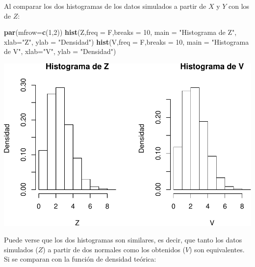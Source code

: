 \documentclass[]{article}
\newenvironment{Shaded}{\begin{snugshade}}{\end{snugshade}}
\newcommand{\KeywordTok}[1]{\textcolor[rgb]{0.13,0.29,0.53}{\textbf{#1}}}
\newcommand{\DataTypeTok}[1]{\textcolor[rgb]{0.13,0.29,0.53}{#1}}
\newcommand{\DecValTok}[1]{\textcolor[rgb]{0.00,0.00,0.81}{#1}}
\newcommand{\StringTok}[1]{\textcolor[rgb]{0.31,0.60,0.02}{#1}}
\newcommand{\NormalTok}[1]{#1}
\begin{document}
Al comparar los dos histogramas de los datos simulados a partir de \(X\)
y \(Y\) con los de \(Z\):

\begin{Shaded}
\begin{Highlighting}[]
\KeywordTok{par}\NormalTok{(}\DataTypeTok{mfrow=}\KeywordTok{c}\NormalTok{(}\DecValTok{1}\NormalTok{,}\DecValTok{2}\NormalTok{))}
\KeywordTok{hist}\NormalTok{(Z,}\DataTypeTok{freq =}\NormalTok{ F,}\DataTypeTok{breaks =} \DecValTok{10}\NormalTok{, }\DataTypeTok{main =} \StringTok{"Histograma de Z"}\NormalTok{, }\DataTypeTok{xlab=}\StringTok{"Z"}\NormalTok{, }\DataTypeTok{ylab =} \StringTok{"Densidad"}\NormalTok{)}
\KeywordTok{hist}\NormalTok{(V,}\DataTypeTok{freq =}\NormalTok{ F,}\DataTypeTok{breaks =} \DecValTok{10}\NormalTok{, }\DataTypeTok{main =} \StringTok{"Histograma de V"}\NormalTok{, }\DataTypeTok{xlab=}\StringTok{"V"}\NormalTok{, }\DataTypeTok{ylab =} \StringTok{"Densidad"}\NormalTok{)}
\end{Highlighting}
\end{Shaded}

\includegraphics[width=0.7\linewidth]{notebook_simulaciones_files/figure-latex/unnamed-chunk-4-1}

Puede verse que los dos histogramas son similares, es decir, que tanto
los datos simulados (\(Z\)) a partir de dos normales como los obtenidos
(\(V\)) son equivalentes. Si se comparan con la función de densidad
teórica:
\end{document}

